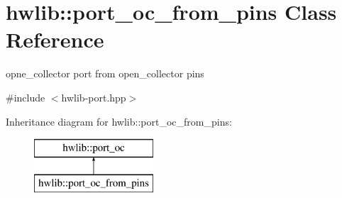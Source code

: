 \hypertarget{classhwlib_1_1port__oc__from__pins}{}\section{hwlib\+:\+:port\+\_\+oc\+\_\+from\+\_\+pins Class Reference}
\label{classhwlib_1_1port__oc__from__pins}


opne\+\_\+collector port from open\+\_\+collector pins  




{\ttfamily \#include $<$hwlib-\/port.\+hpp$>$}

Inheritance diagram for hwlib\+:\+:port\+\_\+oc\+\_\+from\+\_\+pins\+:\begin{figure}[H]
\begin{center}
\leavevmode
\includegraphics[height=2.000000cm]{classhwlib_1_1port__oc__from__pins}
\end{center}
\end{figure}
